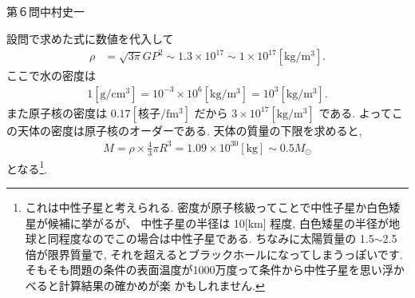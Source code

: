 \begin{answer}{第６問}{中村史一}
\begin{enumerate}
  設問で求めた式に数値を代入して
  \begin{align}
    \rho &= \sqrt{3\pi} GP^2 \sim 1.3\times 10^{17} \sim 1\times 10^{17} [\mathrm{kg/m^3}].
  \end{align}
  ここで水の密度は
  \begin{align}
    1[\mathrm{g/cm^3}]=10^{-3}\times 10^6 [\mathrm{kg/m^3}] = 10^3[\mathrm{kg/m^3}].
  \end{align}
  また原子核の密度は $0.17[\mathrm{核子/fm^3}]$ だから $3\times10^{17}[\mathrm{kg/m^3}]$ である.
  よってこの天体の密度は原子核のオーダーである. 天体の質量の下限を求めると,
  \begin{align}
    M = \rho\times\frac 43 \pi R^3 = 1.09\times10^{30}[\mathrm{kg}] \sim 0.5M_\odot
  \end{align}
  となる\footnote{これは中性子星と考えられる. 密度が原子核級ってことで中性子星か白色矮星が候補に挙がるが、
  中性子星の半径は 10[km] 程度, 白色矮星の半径が地球と同程度なのでこの場合は中性子星である.
  ちなみに太陽質量の 1.5$\sim$2.5 倍が限界質量で, それを超えるとブラックホールになってしまうっぽいです.
  そもそも問題の条件の表面温度が1000万度って条件から中性子星を思い浮かべると計算結果の確かめが楽
  かもしれません.}.
\end{enumerate}
\end{answer}
